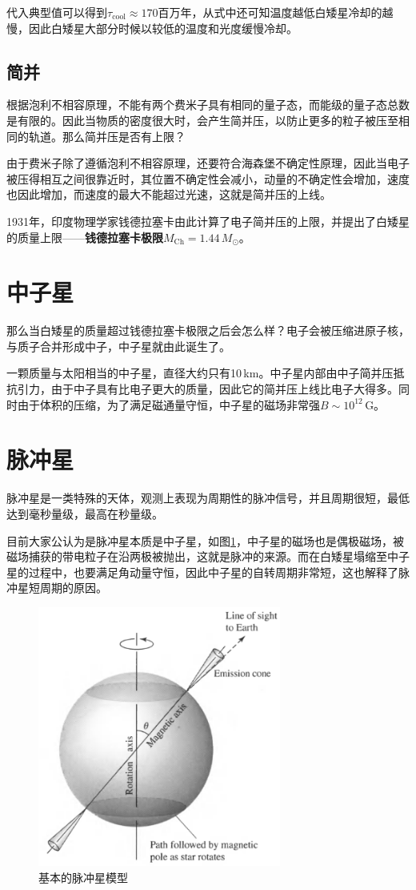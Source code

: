 \documentclass[openany]{ctexbook}
\begin{document}
代入典型值可以得到$\tau_\mathrm{cool}\approx 170$\;百万年，从式中还可知温度越低白矮星冷却的越慢，因此白矮星大部分时候以较低的温度和光度缓慢冷却。

\subsection{简并}
根据泡利不相容原理，不能有两个费米子具有相同的量子态，而能级的量子态总数是有限的。因此当物质的密度很大时，会产生简并压，以防止更多的粒子被压至相同的轨道。那么简并压是否有上限？

由于费米子除了遵循泡利不相容原理，还要符合海森堡不确定性原理，因此当电子被压得相互之间很靠近时，其位置不确定性会减小，动量的不确定性会增加，速度也因此增加，而速度的最大不能超过光速，这就是简并压的上线。

1931年，印度物理学家钱德拉塞卡由此计算了电子简并压的上限，并提出了白矮星的质量上限——\textbf{钱德拉塞卡极限}$M_\mathrm{Ch}=1.44\,M_\odot$。

\section{中子星}
那么当白矮星的质量超过钱德拉塞卡极限之后会怎么样？电子会被压缩进原子核，与质子合并形成中子，中子星就由此诞生了。

一颗质量与太阳相当的中子星，直径大约只有10\,km。中子星内部由中子简并压抵抗引力，由于中子具有比电子更大的质量，因此它的简并压上线比电子大得多。同时由于体积的压缩，为了满足磁通量守恒，中子星的磁场非常强$B\sim10^{12}\,$G。

\section{脉冲星}
脉冲星是一类特殊的天体，观测上表现为周期性的脉冲信号，并且周期很短，最低达到毫秒量级，最高在秒量级。

目前大家公认为是脉冲星本质是中子星，如图\ref{fig:pulsar}，中子星的磁场也是偶极磁场，被磁场捕获的带电粒子在沿两极被抛出，这就是脉冲的来源。而在白矮星塌缩至中子星的过程中，也要满足角动量守恒，因此中子星的自转周期非常短，这也解释了脉冲星短周期的原因。

\begin{figure}[hbt]
  \centering
  \includegraphics[width=8cm]{chapters/16/pulsar}
  \caption{基本的脉冲星模型}
  \label{fig:pulsar}
\end{figure}
\end{document}
